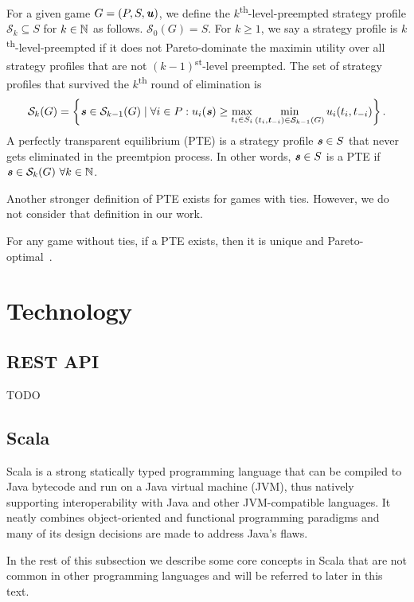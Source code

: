 \begin{definition}
  For a given game $G = (P, S, \boldsymbol{\mathit{u}})$, we define the $k$\textsuperscript{th}-level-preempted strategy profile $\mathcal{S}_k \subseteq S$ for $k \in \mathbb{N}$ as follows.
  $\mathcal{S}_0(G) = S$.
  For $k \ge 1$, we say a strategy profile is $k$\textsuperscript{th}-level-preempted if it does not Pareto-dominate the maximin utility over all strategy profiles that are not $(k-1)$\textsuperscript{st}-level preempted.
  The set of strategy profiles that survived the $k$\textsuperscript{th} round of elimination is
  \[
    \mathcal{S}_k(G) = \left\{\boldsymbol{\mathit{s}} \in \mathcal{S}_{k-1}(G) \mid \forall i \in P: u_i(\boldsymbol{\mathit{s}}) \ge \max_{t_i \in S_i}\min_{(t_i, \boldsymbol{\mathit{t}}_{-i}) \in \mathcal{S}_{k-1}(G)} u_i(t_i, t_{-i})\right\}.
  \]
  A perfectly transparent equilibrium (PTE) is a strategy profile $\boldsymbol{\mathit{s}} \in S$ that never gets eliminated in the preemtpion process.
  In other words, $\boldsymbol{\mathit{s}} \in S$ is a PTE if $\boldsymbol{\mathit{s}} \in \mathcal{S}_k(G)\ \forall k \in \mathbb{N}$.
\end{definition}

\begin{remark}
  Another stronger definition of PTE exists for games with ties.
  However, we do not consider that definition in our work.
\end{remark}

For any game without ties, if a PTE exists, then it is unique and Pareto-optimal~\cite{Fourny20}.


\section{Technology}

\subsection{REST API}
TODO

\subsection{Scala}
Scala is a strong statically typed programming language that can be compiled to Java bytecode and run on a Java virtual machine (JVM), thus natively supporting interoperability with Java and other JVM-compatible languages.
It neatly combines object-oriented and functional programming paradigms and many of its design decisions are made to address Java's flaws.

In the rest of this subsection we describe some core concepts in Scala that are not common in other programming languages and will be referred to later in this text.

